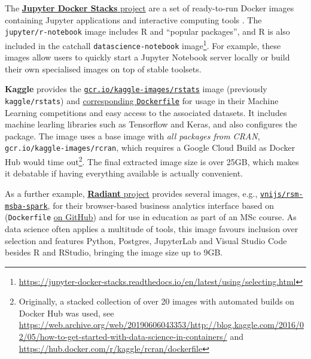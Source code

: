 The \href{https://github.com/jupyter/docker-stacks/}{\textbf{Jupyter
Docker Stacks} project} are a set of ready-to-run Docker images
containing Jupyter applications and interactive computing tools
\citep{project_jupyter_jupyter_2018}. The \texttt{jupyter/r-notebook}
image includes R and ``popular packages'', and R is also included in the
catchall \texttt{datascience-notebook}
image\footnote{\href{https://jupyter-docker-stacks.readthedocs.io/en/latest/using/selecting.html}{https://jupyter-docker-stacks.readthedocs.io/en/latest/using/selecting.html}}.
For example, these images allow users to quickly start a Jupyter
Notebook server locally or build their own specialised images on top of
stable toolsets.

\textbf{Kaggle} provides the
\href{https://hub.docker.com/r/kaggle/rstats}{\texttt{gcr.io/kaggle-images/rstats}}
image (previously \texttt{kaggle/rstats}) and
\href{https://github.com/Kaggle/docker-rstats}{corresponding
\texttt{Dockerfile}} for usage in their Machine Learning competitions
and easy access to the associated datasets. It includes machine learling
libraries such as Tensorflow and Keras, and also configures the
 package. The image uses a base image with \emph{all
packages from CRAN}, \texttt{gcr.io/kaggle-images/rcran}, which requires
a Google Cloud Build as Docker Hub would time
out\footnote{Originally, a stacked collection of over 20 images with automated builds on Docker Hub was used, see \href{https://web.archive.org/web/20190606043353/http://blog.kaggle.com/2016/02/05/how-to-get-started-with-data-science-in-containers/}{https://web.archive.org/web/20190606043353/http://blog.kaggle.com/2016/02/05/how-to-get-started-with-data-science-in-containers/} and \href{https://hub.docker.com/r/kaggle/rcran/dockerfile}{https://hub.docker.com/r/kaggle/rcran/dockerfile}}.
The final extracted image size is over 25GB, which makes it debatable if
having everything available is actually convenient.

As a further example,
\href{https://radiant-rstats.github.io/docs/}{\textbf{Radiant} project}
provides several images, e.g.,
\href{https://hub.docker.com/r/vnijs/rsm-msba-spark}{\texttt{vnijs/rsm-msba-spark}},
for their browser-based business analytics interface based on
 (\texttt{Dockerfile}
\href{https://github.com/radiant-rstats/docker}{on GitHub}) and for use
in education as part of an MSc course. As data science often applies a
multitude of tools, this image favours inclusion over selection and
features Python, Postgres, JupyterLab and Visual Studio Code besides R
and RStudio, bringing the image size up to 9GB.

